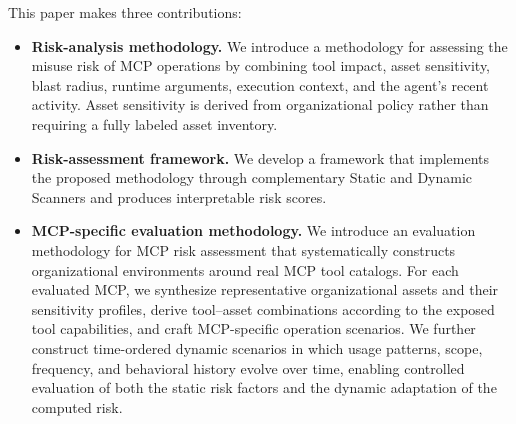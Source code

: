 \documentclass[sigconf]{acmart}
\begin{document}
This paper makes three contributions:
\begin{itemize}
    \item \textbf{Risk-analysis methodology.}
    We introduce a methodology for assessing the misuse risk of MCP operations by combining tool impact, asset sensitivity, blast radius, runtime arguments, execution context, and the agent's recent activity. Asset sensitivity is derived from organizational policy rather than requiring a fully labeled asset inventory.

    \item \textbf{Risk-assessment framework.}
    We develop a framework that implements the proposed methodology through complementary Static and Dynamic Scanners and produces interpretable risk scores.

\item \textbf{MCP-specific evaluation methodology.}
    We introduce an evaluation methodology for MCP risk assessment that systematically constructs organizational environments around real MCP tool catalogs. For each evaluated MCP, we synthesize representative organizational assets and their sensitivity profiles, derive tool--asset combinations according to the exposed tool capabilities, and craft MCP-specific operation scenarios. We further construct time-ordered dynamic scenarios in which usage patterns, scope, frequency, and behavioral history evolve over time, enabling controlled evaluation of both the static risk factors and the dynamic adaptation of the computed risk.
\end{itemize}







\end{document}
